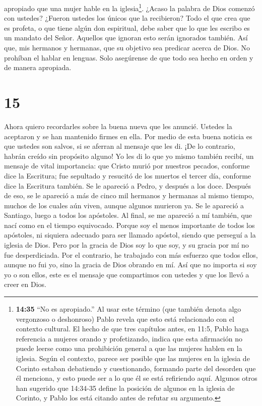 apropiado que una mujer hable en la iglesia\footnote{\textbf{14:35} ``No
  es apropiado.'' Al usar este término (que también denota algo
  vergonzoso o deshonroso) Pablo revela que esto está relacionado con el
  contexto cultural. El hecho de que tres capítulos antes, en 11:5,
  Pablo haga referencia a mujeres orando y profetizando, indica que esta
  afirmación no puede leerse como una prohibición general a que las
  mujeres hablen en la iglesia. Según el contexto, parece ser posible
  que las mujeres en la iglesia de Corinto estaban debatiendo y
  cuestionando, formando parte del desorden que él menciona, y esto
  puede ser a lo que él se está refiriendo aquí. Algunos otros han
  sugerido que 14:34-35 define la posición de algunos en la iglesia de
  Corinto, y Pablo los está citando antes de refutar su argumento.}.
 ¿Acaso la palabra de Dios comenzó con ustedes? ¿Fueron
ustedes los únicos que la recibieron?  Todo el que crea que
es profeta, o que tiene algún don espiritual, debe saber que lo que les
escribo es un mandato del Señor.  Aquellos que ignoran esto
serán ignorados también.  Así que, mis hermanos y hermanas,
que su objetivo sea predicar acerca de Dios. No prohíban el hablar en
lenguas.  Solo asegúrense de que todo sea hecho en orden y
de manera apropiada.

\hypertarget{section-14}{%
\section{15}\label{section-14}}

 Ahora quiero recordarles sobre la buena nueva que les
anuncié. Ustedes la aceptaron y se han mantenido firmes en ella.
 Por medio de esta buena noticia es que ustedes son salvos,
si se aferran al mensaje que les di. ¡De lo contrario, habrán creído sin
propósito alguno!  Yo les di lo que yo mismo también recibí,
un mensaje de vital importancia: que Cristo murió por nuestros pecados,
conforme dice la Escritura;  fue sepultado y resucitó de los
muertos el tercer día, conforme dice la Escritura también. 
Se le apareció a Pedro, y después a los doce.  Después de
eso, se le apareció a más de cinco mil hermanos y hermanas al mismo
tiempo, muchos de los cuales aún viven, aunque algunos murieron ya.
 Se le apareció a Santiago, luego a todos los apóstoles.
 Al final, se me apareció a mí también, que nací como en el
tiempo equivocado.  Porque soy el menos importante de todos
los apóstoles, ni siquiera adecuado para ser llamado apóstol, siendo que
perseguí a la iglesia de Dios.  Pero por la gracia de Dios
soy lo que soy, y su gracia por mí no fue desperdiciada. Por el
contrario, he trabajado con más esfuerzo que todos ellos, aunque no fui
yo, sino la gracia de Dios obrando en mí.  Así que no
importa si soy yo o son ellos, este es el mensaje que compartimos con
ustedes y que los llevó a creer en Dios.

